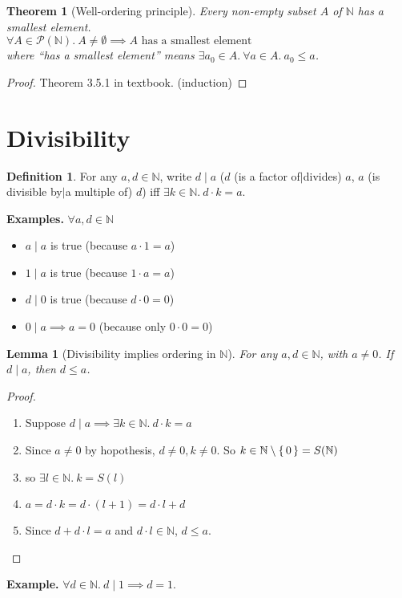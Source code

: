 \documentclass[12pt]{article}
\newenvironment{prf}
{
    \begin{proof}
        \hfill
        \begin{enumerate}[label*=\arabic*.]
                }
                {
                \hfill\qedsymbol
        \end{enumerate}
    \renewcommand{\qedsymbol}{}
    \end{proof}
}
\newcounter{dummy} \numberwithin{dummy}{section}
\numberwithin{equation}{dummy}
\newtheorem{theorem}[dummy]{Theorem}
\newtheorem{lemma}[dummy]{Lemma}
\theoremstyle{definition}
\newtheorem{defn}[dummy]{Definition}
\newcommand{\nat}{\mathbb{N}}
\newcommand{\power}{\mathcal{P}}
\begin{document}
\setcounter{section}{15}
\begin{theorem}[Well-ordering principle]
    Every non-empty subset $A$ of $\nat$ has a smallest element.\\
    $\forall A \in \power(\nat).~ A \ne \emptyset \implies A \text{ has a smallest element}$\\
    \phantom{$\forall A \in \power(\nat).~ A$}\quad where ``has a smallest element'' means $\exists a_0 \in A.~ \forall a \in A.~ a_0 \leq a$.
\end{theorem}
\begin{proof}
    Theorem 3.5.1 in textbook. (induction) \renewcommand{\qedsymbol}{}
\end{proof}

\section{Divisibility}
\begin{defn}
    For any $a,d\in\nat$, write $d\mid a$ ($d$ (is a factor of$|$divides) $a$, $a$ (is divisible by$|$a multiple of) $d$)
    iff $\exists k \in\nat.~ d\cdot k=a$.
\end{defn}
\textbf{Examples.}
    $\forall a,d\in\nat$
\begin{itemize}
    \item $a\mid a$ is true (because $a\cdot 1=a$)
    \item $1\mid a$ is true (because $1\cdot a=a$)
    \item $d\mid 0$ is true (because $d\cdot 0=0$)
    \item $0\mid a \implies a=0$ (because only $0\cdot 0 = 0$)
\end{itemize}
\begin{lemma}[Divisibility implies ordering in $\nat$]
    For any $a,d\in\nat$, with $a\ne 0$. If $d\mid a$, then $d\leq a$.
\end{lemma}
\begin{prf}
\item Suppose $d\mid a \implies \exists k\in\nat.~ d\cdot k = a$
\item Since $a\ne 0$ by hopothesis, $d\ne 0, k\ne 0$. So $k \in \nat\setminus\set{0} = S(\nat)$
\item so $\exists l \in \nat.~ k = S(l)$
\item $a = d\cdot k = d\cdot(l+1) = d\cdot l + d$
\item Since $d + d\cdot l = a$ and $d\cdot l \in \nat$, $d \leq a$.
\end{prf}
\textbf{Example.} $\forall d\in\nat.~ d\mid 1 \implies d=1$.
\end{document}
